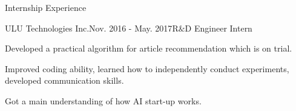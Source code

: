 \documentclass{resume} %
\begin{document}
\begin{comment}
\begin{rSubsection}{Large-Scale WEB Vulnerability Detection by Supervised Learning}{Oct. 2014 - June. 2015}{}{}
\item Developed an algorithm to detect malicious URLs from Shanghai Telecomm 120 gigabytes web log.
\item Extracted information including Whois, IP connection and URLs to form feature vectors.
\item Trained multiclass-SVM to classify benign or malicious URLs based on labels obtained from Google Safe Browsing API and achieved 86\% accuracy.
\end{rSubsection}

\begin{rSubsection}{Vehicle WLAN Based Car Sharing Platform}{Mar. 2014 - Dec. 2014}{}{}
\item Designed a car sharing system in 3-person team with vehicle based hardware, Android APP and web platform to improve efficiency of car rental service. 
\item Enrolled in Fourth Shanghai College Innovation \& Entrepreneurship Forum (3/300 selected from SJTU).
\item Patented in China : CN104836860 A
\end{rSubsection}

\end{rSection}
\vspace{0.5em}
\end{comment}
\begin{rSection}{Internship Experience}
\begin{rSubsection}{ULU Technologies Inc.}{Nov. 2016 - May. 2017}{R$\&$D  Engineer Intern}{}
\item Developed a practical algorithm for article recommendation which is on trial.
\item Improved coding ability, learned how to independently conduct experiments, developed communication skills.
\item Got a main understanding of how AI start-up works.
\end{rSubsection}
\end{rSection}
\end{document}

